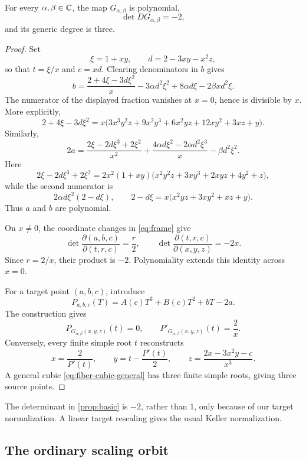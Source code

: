 \documentclass[11pt,reqno]{amsart}
\begin{document}
\begin{proposition}
\label{prop:basic}
For every \(\alpha,\beta\in\mathbb C\), the map \(G_{\alpha,\beta}\) is polynomial,
\[
\det DG_{\alpha,\beta}=-2,
\]
and its generic degree is three.
\end{proposition}

\begin{proof}
Set
\[
\xi=1+xy,\qquad d=2-3xy-x^2z,
\]
so that \(t=\xi/x\) and \(c=xd\).  Clearing denominators in \(b\) gives
\[
b=
\frac{2+4\xi-3d\xi^2}{x}
-3\alpha d^2\xi^2+8\alpha d\xi
-2\beta x d^2\xi.
\]
The numerator of the displayed fraction vanishes at \(x=0\), hence is
divisible by \(x\).  More explicitly,
\[
2+4\xi-3d\xi^2
=x\bigl(3x^3y^2z+9x^2y^3+6x^2yz+12xy^2+3xz+y\bigr).
\]
Similarly,
\[
2a=
\frac{2\xi-2d\xi^3+2\xi^2}{x^2}
+\frac{4\alpha d\xi^2-2\alpha d^2\xi^3}{x}
-\beta d^2\xi^2.
\]
Here
\[
2\xi-2d\xi^3+2\xi^2
=2x^2(1+xy)
 \bigl(x^2y^2z+3xy^3+2xyz+4y^2+z\bigr),
\]
while the second numerator is
\[
2\alpha d\xi^2(2-d\xi),\qquad
2-d\xi=x\bigl(x^2yz+3xy^2+xz+y\bigr).
\]
Thus \(a\) and \(b\) are polynomial.

On \(x\ne0\), the coordinate changes in \eqref{eq:frame} give
\[
\det\frac{\partial(a,b,c)}{\partial(t,r,c)}=\frac r2,
\qquad
\det\frac{\partial(t,r,c)}{\partial(x,y,z)}=-2x.
\]
Since \(r=2/x\), their product is \(-2\).  Polynomiality extends this
identity across \(x=0\).

For a target point \((a,b,c)\), introduce
\begin{equation}
\label{eq:fiber-cubic-general}
P_{a,b,c}(T)=A(c)T^3+B(c)T^2+bT-2a.
\end{equation}
The construction gives
\[
P_{G_{\alpha,\beta}(x,y,z)}(t)=0,\qquad
P'_{G_{\alpha,\beta}(x,y,z)}(t)=\frac2x.
\]
Conversely, every finite simple root \(t\) reconstructs
\begin{equation}
\label{eq:reconstruct}
x=\frac2{P'(t)},\qquad
y=t-\frac{P'(t)}2,\qquad
z=\frac{2x-3x^2y-c}{x^3}.
\end{equation}
A general cubic \eqref{eq:fiber-cubic-general} has three finite simple roots,
giving three source points.
\end{proof}

\begin{remark}
The determinant in \cref{prop:basic} is \(-2\), rather than \(1\), only
because of our target normalization.  A linear target rescaling gives the
usual Keller normalization.
\end{remark}

\subsection{The ordinary scaling orbit}
\end{document}
